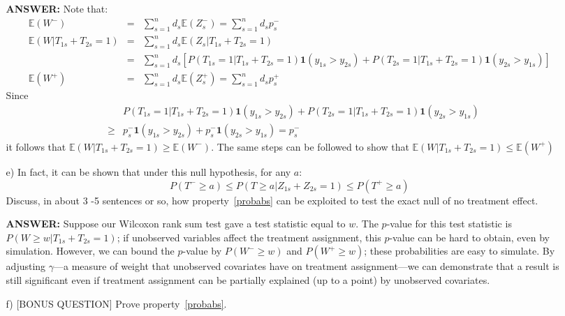 \documentclass{article}
\newcommand{\E}[0]{\mathbb{E}}
\begin{document}
\begin{itemize}
\begin{itemize}
          \textbf{ANSWER:}
          Note that:
          \begin{eqnarray*}
            \E(W^-) &=& \sum_{s=1}^n d_s\E(Z^-_s) = \sum_{s=1}^n d_s p^-_s\\
            \E(W| T_{1s} + T_{2s} =1) &=& \sum_{s=1}^n d_s\E(Z_s|T_{1s} + T_{2s} =1)\\
            & =& \sum_{s=1}^n d_s\left[
              P(T_{1s} = 1|T_{1s} + T_{2s} =1)\mathbf1(y_{1s} > y_{2s})
              + P(T_{2s} = 1|T_{1s} + T_{2s} =1)\mathbf1(y_{2s} > y_{1s})\right]\\
            \E(W^+)&=& \sum_{s=1}^n d_s\E(Z^+_s) = \sum_{s=1}^n d_s p^+_s
          \end{eqnarray*}
          Since
          \begin{eqnarray*}
            && P(T_{1s} = 1|T_{1s} + T_{2s} =1)\mathbf1(y_{1s} > y_{2s})
              + P(T_{2s} = 1|T_{1s} + T_{2s} =1)\mathbf1(y_{2s} > y_{1s}) \\
            &\geq& p_s^-\mathbf1(y_{1s} > y_{2s})
              + p_s^-\mathbf1(y_{2s} > y_{1s})  = p_s^-
          \end{eqnarray*}
          it follows that $\E(W| T_{1s} + T_{2s} =1) \geq \E(W^-)$.
          The same steps can be followed to show that  $\E(W| T_{1s} + T_{2s} =1) \leq \E(W^+)$
        \item[e)]
          In fact, it can be shown that under this null hypothesis, for any $a$:
          \begin{equation}
            P(T^- \geq a) \leq P(T \geq a | Z_{1s} + Z_{2s} = 1) \leq P(T^+ \geq a)
            \label{probabs}
          \end{equation}
          Discuss, in about 3 -5 sentences or so, how property~\eqref{probabs} can be
          exploited to test the exact null of no treatment effect. 
          
          \textbf{ANSWER:}  Suppose our Wilcoxon rank sum test gave a test statistic equal to
          $w$.  
          The $p$-value for this test statistic is 
          $P(W \geq w | T_{1s} + T_{2s} = 1)$;
          if unobserved variables affect the treatment assignment, this $p$-value can be hard
          to obtain, even by simulation.
          However, we can bound the $p$-value by $P(W^- \geq w)$ and $P(W^+ \geq w)$;
          these probabilities are easy to simulate.
          By adjusting $\gamma$---a measure of weight that unobserved covariates
          have on treatment assignment---we can demonstrate that a result is still significant
          even if treatment assignment can be partially explained (up to a point) by unobserved
          covariates.
        \item[f)] [BONUS QUESTION]
          Prove property~\eqref{probabs}. 
          

\end{itemize}
\end{itemize}
\end{document}
